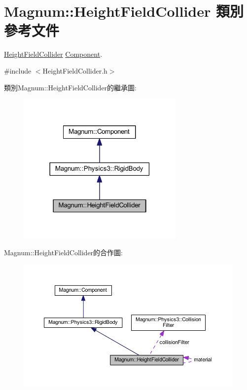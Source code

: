 \hypertarget{class_magnum_1_1_height_field_collider}{}\section{Magnum\+:\+:Height\+Field\+Collider 類別 參考文件}
\label{class_magnum_1_1_height_field_collider}


\hyperlink{class_magnum_1_1_height_field_collider}{Height\+Field\+Collider} \hyperlink{class_magnum_1_1_component}{Component}.  




{\ttfamily \#include $<$Height\+Field\+Collider.\+h$>$}



類別\+Magnum\+:\+:Height\+Field\+Collider的繼承圖\+:\nopagebreak
\begin{figure}[H]
\begin{center}
\leavevmode
\includegraphics[width=231pt]{class_magnum_1_1_height_field_collider__inherit__graph}
\end{center}
\end{figure}


Magnum\+:\+:Height\+Field\+Collider的合作圖\+:\nopagebreak
\begin{figure}[H]
\begin{center}
\leavevmode
\includegraphics[width=350pt]{class_magnum_1_1_height_field_collider__coll__graph}
\end{center}
\end{figure}
